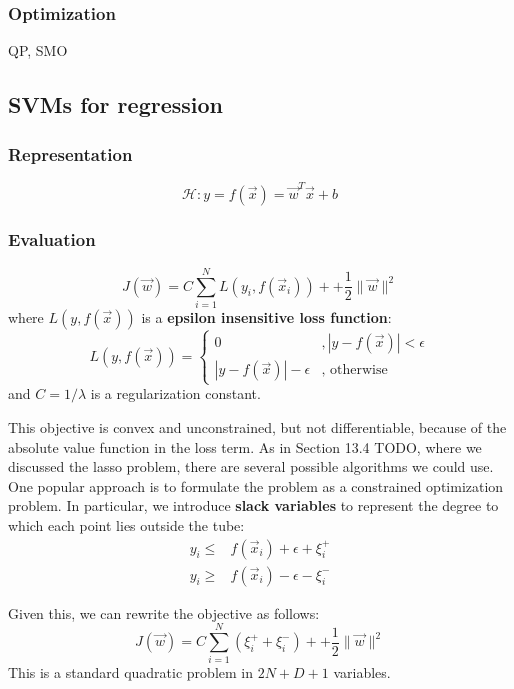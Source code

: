 \subsubsection{Optimization}
QP, SMO


\subsection{SVMs for regression}


\subsubsection{Representation}
\begin{equation}
\mathcal{H}: y=f(\vec{x})=\vec{w}^T\vec{x}+b
\end{equation}


\subsubsection{Evaluation}
\begin{equation}
J(\vec{w})=C\sum\limits_{i=1}^N L(y_i,f(\vec{x}_i))++\dfrac{1}{2}\lVert\vec{w}\rVert^2
\end{equation}
where $L(y,f(\vec{x}))$ is a \textbf{epsilon insensitive loss function}:
\begin{equation}
L(y,f(\vec{x})) = \begin{cases}
0  & , |y-f(\vec{x})|<\epsilon \\
|y-f(\vec{x})|-\epsilon  & , \text{ otherwise}
\end{cases}
\end{equation}
and $C=1/\lambda$ is a regularization constant. 

This objective is convex and unconstrained, but not differentiable, because of the absolute value function in the loss term. As in Section 13.4 TODO, where we discussed the lasso problem, there are several possible algorithms we could use. One popular approach is to formulate the problem as a constrained optimization problem. In particular, we introduce \textbf{slack variables} to represent the degree to which each point lies outside the tube:
\begin{align*}
y_i \leq & f(\vec{x}_i)+\epsilon+\xi_i^+ \\
y_i \geq & f(\vec{x}_i)-\epsilon-\xi_i^- 
\end{align*}

Given this, we can rewrite the objective as follows:
\begin{equation}
J(\vec{w})=C\sum\limits_{i=1}^N (\xi_i^+ + \xi_i^-)++\dfrac{1}{2}\lVert\vec{w}\rVert^2
\end{equation}
This is a standard quadratic problem in $2N+D+1$ variables.


